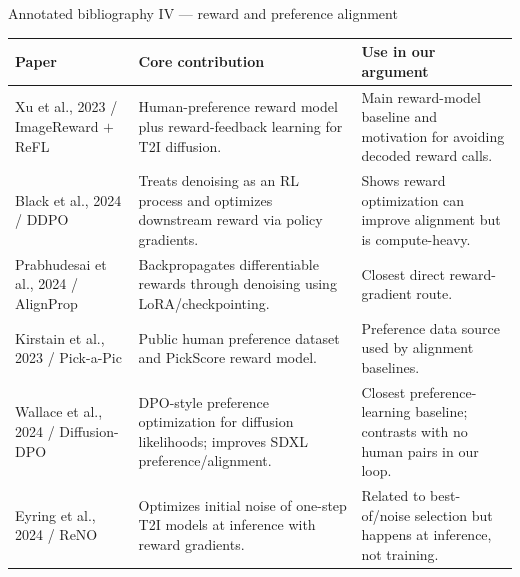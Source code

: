 \documentclass[aspectratio=169,10pt]{beamer}
\begin{document}
\begin{frame}[shrink=6]{Annotated bibliography IV --- reward and preference alignment}
  \scriptsize
  \begin{adjustbox}{max width=\textwidth, max height=0.80\textheight, center}
  \begin{tabular}{@{}L{0.22\textwidth}L{0.34\textwidth}L{0.34\textwidth}@{}}
    \toprule
    \textbf{Paper} & \textbf{Core contribution} & \textbf{Use in our argument} \\
    \midrule
    Xu et al., 2023 / ImageReward $+$ ReFL & Human-preference reward model plus reward-feedback learning for T2I diffusion. & Main reward-model baseline and motivation for avoiding decoded reward calls. \\
    Black et al., 2024 / DDPO & Treats denoising as an RL process and optimizes downstream reward via policy gradients. & Shows reward optimization can improve alignment but is compute-heavy. \\
    Prabhudesai et al., 2024 / AlignProp & Backpropagates differentiable rewards through denoising using LoRA/checkpointing. & Closest direct reward-gradient route. \\
    Kirstain et al., 2023 / Pick-a-Pic & Public human preference dataset and PickScore reward model. & Preference data source used by alignment baselines. \\
    Wallace et al., 2024 / Diffusion-DPO & DPO-style preference optimization for diffusion likelihoods; improves SDXL preference/alignment. & Closest preference-learning baseline; contrasts with no human pairs in our loop. \\
    Eyring et al., 2024 / ReNO & Optimizes initial noise of one-step T2I models at inference with reward gradients. & Related to best-of/noise selection but happens at inference, not training. \\
    \bottomrule
  \end{tabular}
  \end{adjustbox}
\end{frame}
\end{document}

